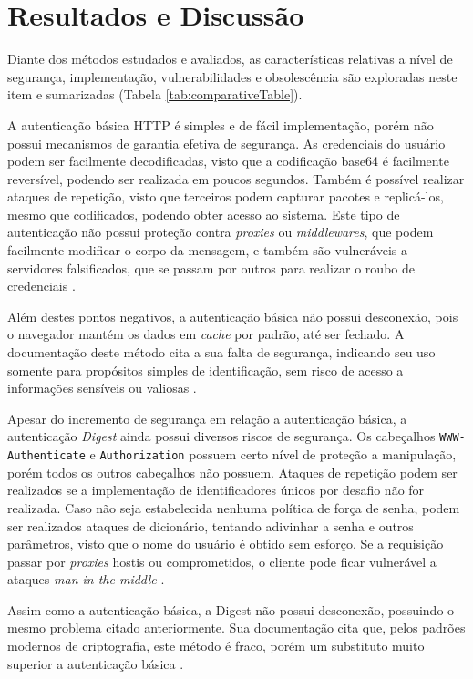 \section{Resultados e Discussão}

Diante dos métodos estudados e avaliados, as características relativas a nível de segurança, 
implementação, vulnerabilidades e obsolescência são exploradas neste item e sumarizadas (Tabela 
\ref{tab:comparativeTable}).

A autenticação básica HTTP é simples e de fácil implementação, porém não possui mecanismos de 
garantia efetiva de segurança. As credenciais do usuário podem ser facilmente decodificadas, visto 
que a codificação base64 é facilmente reversível, podendo ser realizada em poucos segundos. Também 
é possível realizar ataques de repetição, visto que terceiros podem capturar pacotes e replicá-los, 
mesmo que codificados, podendo obter acesso ao sistema. Este tipo de autenticação não possui proteção 
contra \emph{proxies} ou \emph{middlewares}, que podem facilmente modificar o corpo da mensagem, e 
também são vulneráveis a servidores falsificados, que se passam por outros para realizar o roubo de 
credenciais \cite{GOURLEY2002}.

Além destes pontos negativos, a autenticação básica não possui desconexão, pois o navegador mantém 
os dados em \emph{cache} por padrão, até ser fechado. A documentação deste método cita a sua falta 
de segurança, indicando seu uso somente para propósitos simples de identificação, sem risco de 
acesso a informações sensíveis ou valiosas \cite{RFC7617}. 

Apesar do incremento de segurança em relação a autenticação básica, a autenticação 
\emph{Digest} ainda possui diversos riscos de segurança. Os cabeçalhos 
\texttt{WWW-Authenticate} e \texttt{Authorization} possuem certo nível de proteção a manipulação, 
porém todos os outros cabeçalhos não possuem. Ataques de repetição podem ser realizados se a 
implementação de identificadores únicos por desafio não for realizada. Caso não seja estabelecida 
nenhuma política de força de senha, podem ser realizados ataques de dicionário, tentando adivinhar 
a senha e outros parâmetros, visto que o nome do usuário é obtido sem esforço. Se a requisição 
passar por \emph{proxies} hostis ou comprometidos, o cliente pode ficar vulnerável a ataques 
\emph{man-in-the-middle} \cite{GOURLEY2002}. 

Assim como a autenticação básica, a Digest não possui desconexão, possuindo o mesmo problema citado
anteriormente. Sua documentação cita que, pelos padrões modernos de criptografia, este método 
é fraco, porém um substituto muito superior a autenticação básica \cite{RFC7616}.


